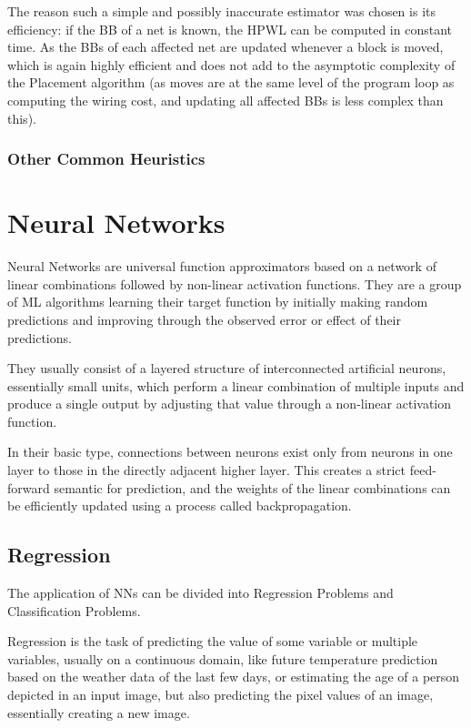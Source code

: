 The reason such a simple and possibly inaccurate estimator was chosen is its efficiency: if the \gls{BB} of a net is known, the \gls{HPWL} can be computed in constant time. As the \glspl{BB} of each affected net are updated whenever a block is moved, which is again highly efficient and does not add to the asymptotic complexity of the Placement algorithm (as moves are at the same level of the program loop as computing the wiring cost, and updating all affected \glspl{BB} is less complex than this).

\subsubsection{Other Common Heuristics}

\section{Neural Networks}

Neural Networks are universal function approximators based on a network of linear combinations followed by non-linear activation functions. They are a group of \gls{ML} algorithms learning their target function by initially making random predictions and improving through the observed error or effect of their predictions.

They usually consist of a layered structure of interconnected artificial neurons, essentially small units, which perform a linear combination of multiple inputs and produce a single output by adjusting that value through a non-linear activation function.

In their basic type, connections between neurons exist only from neurons in one layer to those in the directly adjacent higher layer. This creates a strict feed-forward semantic for prediction, and the weights of the linear combinations can be efficiently updated using a process called backpropagation.

\subsection{Regression}

The application of \glspl{NN} can be divided into Regression Problems and Classification Problems. 

Regression is the task of predicting the value of some variable or multiple variables, usually on a continuous domain, like future temperature prediction based on the weather data of the last few days, or estimating the age of a person depicted in an input image, but also predicting the pixel values of an image, essentially creating a new image.

